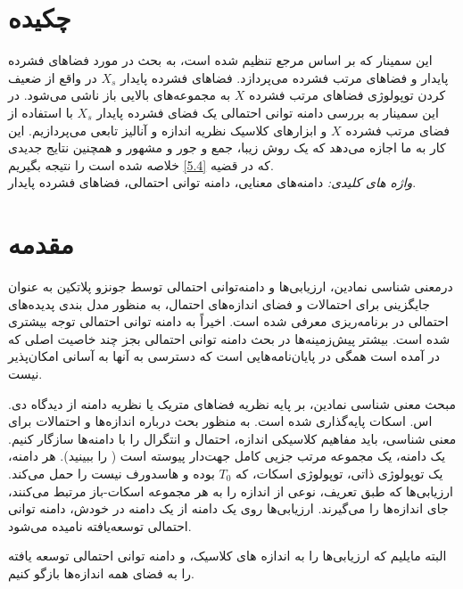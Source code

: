 \documentclass[12pt,a4paper]{article}
\theoremstyle{definition}
\theoremstyle{theorem}
\theoremstyle{definition}
\begin{document}
\section*{چکیده}
این سمینار که بر اساس مرجع 
\cite{main}
تنظیم شده است، به بحث در مورد فضاهای فشرده پایدار و فضاهای مرتب فشرده می‌پردازد.
فضاهای فشرده پایدار 
$ X_{s} $
در واقع از ضعیف کردن توپولوژی فضاهای مرتب فشرده 
$ X $
به مجموعه‌های بالایی باز ناشی می‌شود. در این سمینار به بررسی دامنه توانی احتمالی یک فضای فشرده پایدار 
$ X_{s} $
با استفاده از فضای مرتب فشرده 
$ X $
و ابزارهای کلاسیک نظریه اندازه و آنالیز تابعی می‌پردازیم. این کار به ما اجازه می‌دهد که یک روش زیبا، جمع ‌و جور و مشهور و همچنین نتایج جدیدی که در قضیه
\ref{5.4}
 خلاصه شده است را نتیجه بگیریم.\\
\textit{واژه های کلیدی:}
دامنه‌های معنایی،  دامنه توانی احتمالی،  فضاهای فشرده پایدار.
\section{مقدمه}
درمعنی شناسی نمادین،  ارزیابی‌ها و دامنه‌توانی احتمالی توسط جونزو پلاتکین\cite{Jones}
به عنوان جایگزینی برای احتمالات و فضای اندازه‌های احتمال، به منظور مدل بندی پدیده‌‌‌‌‌‌‌های احتمالی در برنامه‌ریزی معرفی شده است. اخیراً به دامنه توانی احتمالی توجه بیشتری شده است. بیشتر پیش‌زمینه‌ها در بحث دامنه توانی احتمالی بجز چند خاصیت اصلی که در
\cite{G. Gierz}
 آمده است همگی در پایان‌نامه‌هایی است که دسترسی به آنها به آسانی امکان‌پذیر نیست.


مبحث معنی ‌شناسی نمادین، بر پایه نظریه فضاهای متریک یا نظریه دامنه از دیدگاه 
\linebreak
 دی. اس. اسکات
پایه‌گذاری شده است.  به منظور بحث درباره اندازه‌ها و احتمالات برای معنی شناسی، باید مفاهیم کلاسیکی اندازه،  احتمال و انتگرال را با دامنه‌ها سازگار کنیم.  یک دامنه، 
یک مجموعه مرتب  جزیی کامل جهت‌دار پیوسته است (\cite{G. Gierz}
 را ببینید). هر دامنه،  یک توپولوژی ذاتی، توپولوژی اسکات، که
$ T_{0} $
بوده و هاسدورف نیست را حمل می‌کند. ارزیابی‌ها که طبق تعریف، نوعی از اندازه را به هر مجموعه اسکات-باز مرتبط می‌کنند، جای اندازه‌ها را می‌گیرند. ارزیابی‌ها روی یک دامنه از یک دامنه در خودش، دامنه توانی احتمالی توسعه‌یافته نامیده می‌شود.
 
 البته مایلیم که ارزیابی‌ها را به اندازه های کلاسیک، و دامنه توانی احتمالی توسعه یافته را به فضای همه اندازه‌ها بازگو کنیم.
 
\end{document}
